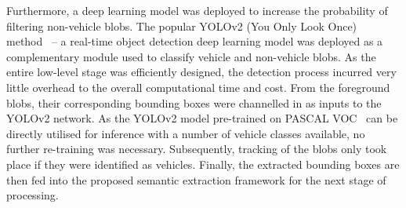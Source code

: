 




Furthermore, a deep learning model was deployed to increase the probability of filtering non-vehicle blobs.
The popular YOLOv2 (You Only Look Once) method~\cite{redmon2016you} -- a real-time object detection deep learning model was deployed as a complementary module used to classify vehicle and non-vehicle blobs.
As the entire low-level stage was efficiently designed, the detection process incurred very little overhead to the overall computational time and cost.
From the foreground blobs, their corresponding bounding boxes were channelled in as inputs to the YOLOv2 network.
As the YOLOv2 model pre-trained on PASCAL VOC~\cite{everingham2010pascal} can be directly utilised for inference with a number of vehicle classes available, no further re-training was necessary. Subsequently, tracking of the blobs only took place if they were identified as vehicles. Finally, the extracted bounding boxes are then fed into the proposed semantic extraction framework for the next stage of processing.


